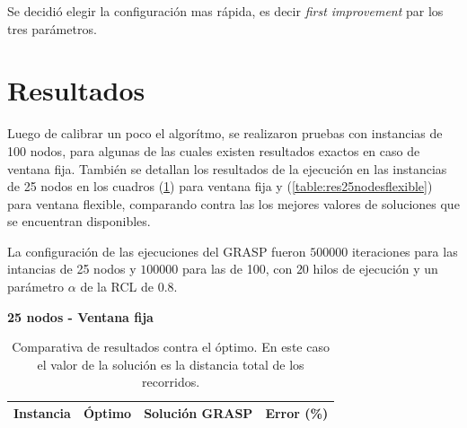 \documentclass{article}
\begin{document}
  Se decidió elegir la configuración mas rápida, es decir {\it first improvement} par los tres parámetros.

  \section*{Resultados}

  Luego de calibrar un poco el algorítmo, se realizaron pruebas con instancias de 100 nodos, para algunas de las cuales existen resultados exactos en caso de ventana fija. También se detallan los resultados de la ejecución en las instancias de 25 nodos en los cuadros (\ref{table:res25nodesfixed}) para ventana fija y (\ref{table:res25nodesflexible}) para ventana flexible, comparando contra las los mejores valores de soluciones que se encuentran disponibles.

  La configuración de las ejecuciones del GRASP fueron $500000$ iteraciones para las intancias de 25 nodos y $100000$ para las de 100, con $20$ hilos de ejecución y un parámetro $\alpha$ de la RCL de $0.8$.

  \begin{table}
    \centering
    \caption*{{\bf 25 nodos - Ventana fija}}
    \begin{tabular}{cccc}
      \toprule
      Instancia & Óptimo & Solución GRASP & Error (\%) \\
      \midrule
      \bottomrule
    \end{tabular}
    \caption{Comparativa de resultados contra el óptimo. En este caso el valor de la solución es la distancia total de los recorridos.}\label{table:res25nodesfixed}
  \end{table}
\end{document}

